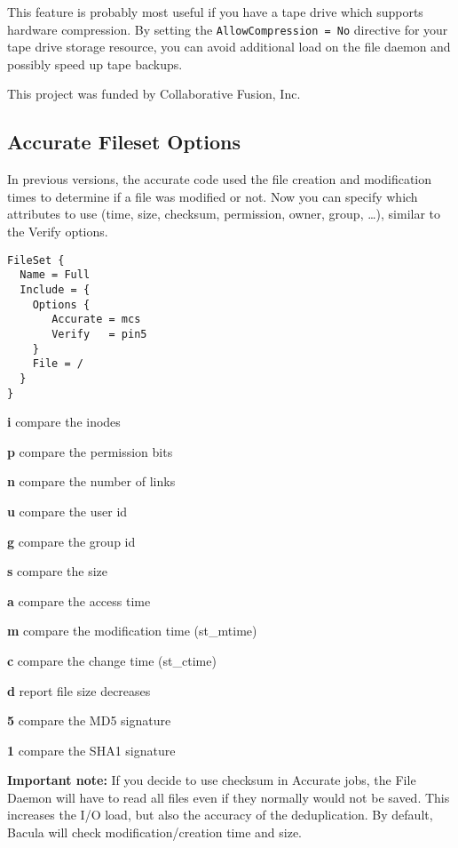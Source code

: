 This feature is probably most useful if you have a tape drive which supports
hardware compression.  By setting the \texttt{AllowCompression = No} directive
for your tape drive storage resource, you can avoid additional load on the file
daemon and possibly speed up tape backups.

This project was funded by Collaborative Fusion, Inc.

\subsection{Accurate Fileset Options}
\label{sec:accuratefileset}

In previous versions, the accurate code used the file creation and modification
times to determine if a file was modified or not. Now you can specify which
attributes to use (time, size, checksum, permission, owner, group, \dots),
similar to the Verify options.

\begin{verbatim}
FileSet {
  Name = Full
  Include = {
    Options {
       Accurate = mcs
       Verify   = pin5
    }
    File = /
  }
}
\end{verbatim}

\begin{description}  
\item {\bf i}  compare the inodes  
\item {\bf p}  compare the permission bits  
\item {\bf n}  compare the number of links  
\item {\bf u}  compare the user id  
\item {\bf g}  compare the group id  
\item {\bf s}  compare the size  
\item {\bf a}  compare the access time  
\item {\bf m}  compare the modification time (st\_mtime)  
\item {\bf c}  compare the change time (st\_ctime)  
\item {\bf d}  report file size decreases  
\item {\bf 5}  compare the MD5 signature  
\item {\bf 1}  compare the SHA1 signature  
\end{description}

\textbf{Important note:} If you decide to use checksum in Accurate jobs,
the File Daemon will have to read all files even if they normally would not
be saved.  This increases the I/O load, but also the accuracy of the
deduplication.  By default, Bacula will check modification/creation time
and size.

